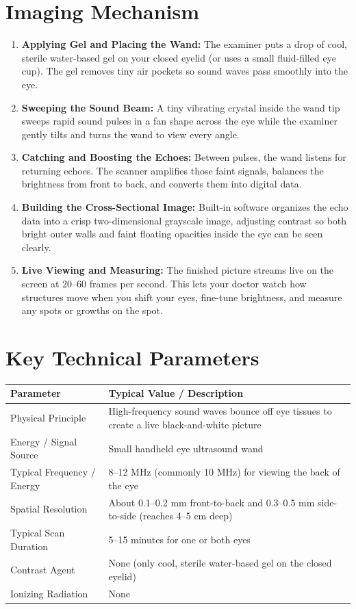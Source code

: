 \section{Imaging Mechanism}
\begin{enumerate}
    \item \textbf{Applying Gel and Placing the Wand:} The examiner puts a drop of cool, sterile water-based gel on your closed eyelid (or uses a small fluid-filled eye cup). The gel removes tiny air pockets so sound waves pass smoothly into the eye.
    \item \textbf{Sweeping the Sound Beam:} A tiny vibrating crystal inside the wand tip sweeps rapid sound pulses in a fan shape across the eye while the examiner gently tilts and turns the wand to view every angle.
    \item \textbf{Catching and Boosting the Echoes:} Between pulses, the wand listens for returning echoes. The scanner amplifies those faint signals, balances the brightness from front to back, and converts them into digital data.
    \item \textbf{Building the Cross-Sectional Image:} Built-in software organizes the echo data into a crisp two-dimensional grayscale image, adjusting contrast so both bright outer walls and faint floating opacities inside the eye can be seen clearly.
    \item \textbf{Live Viewing and Measuring:} The finished picture streams live on the screen at 20--60 frames per second. This lets your doctor watch how structures move when you shift your eyes, fine-tune brightness, and measure any spots or growths on the spot.
\end{enumerate}

\section{Key Technical Parameters}
\noindent
\begin{tabularx}{\textwidth}{@{}l X@{}}
\toprule
\textbf{Parameter} & \textbf{Typical Value / Description} \\
\midrule
Physical Principle & High-frequency sound waves bounce off eye tissues to create a live black-and-white picture \\
Energy / Signal Source & Small handheld eye ultrasound wand \\
Typical Frequency / Energy & 8--12 MHz (commonly 10 MHz) for viewing the back of the eye \\
Spatial Resolution & About 0.1--0.2 mm front-to-back and 0.3--0.5 mm side-to-side (reaches 4--5 cm deep) \\
Typical Scan Duration & 5--15 minutes for one or both eyes \\
Contrast Agent & None (only cool, sterile water-based gel on the closed eyelid) \\
Ionizing Radiation & None \\
\bottomrule
\end{tabularx}

